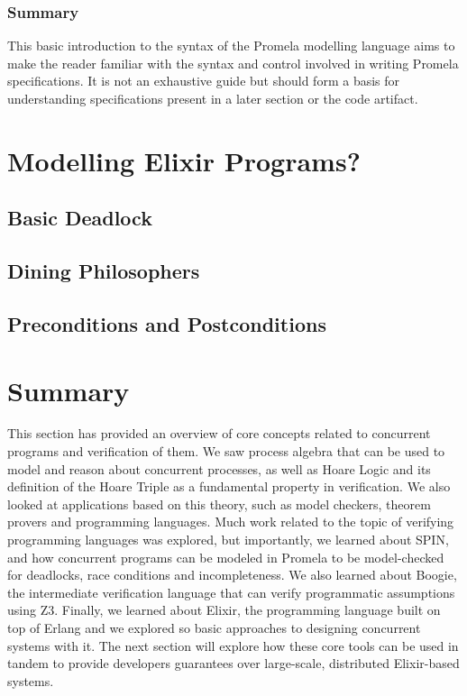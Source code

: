 \subsubsection[]{Summary}
This basic introduction to the syntax of the Promela modelling language aims to make the reader familiar with the syntax and control involved in writing Promela specifications. It is not an exhaustive guide but should form a basis for understanding specifications present in a later section or the code artifact.
\section{Modelling Elixir Programs?}
\subsection{Basic Deadlock}
\subsection{Dining Philosophers}
\subsection{Preconditions and Postconditions}
\section{Summary}
This section has provided an overview of core concepts related to concurrent programs and verification of them. We saw process algebra that can be used to model and reason about concurrent processes, as well as Hoare Logic and its definition of the Hoare Triple as a fundamental property in verification. We also looked at applications based on this theory, such as model checkers, theorem provers and programming languages. Much work related to the topic of verifying programming languages was explored, but importantly, we learned about SPIN, and how concurrent programs can be modeled in Promela to be model-checked for deadlocks, race conditions and incompleteness. We also learned about Boogie, the intermediate verification language that can verify programmatic assumptions using Z3. Finally, we learned about Elixir, the programming language built on top of Erlang and we explored so basic approaches to designing concurrent systems with it. The next section will explore how these core tools can be used in tandem to provide developers guarantees over large-scale, distributed Elixir-based systems.

